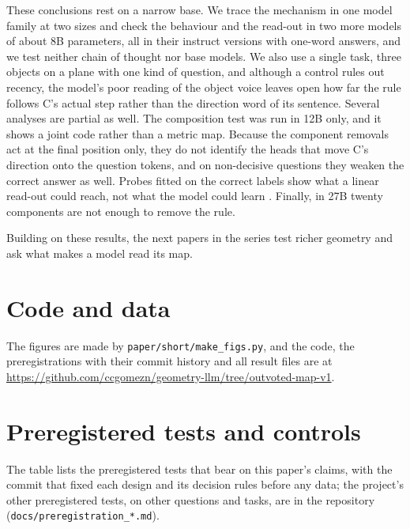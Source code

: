 \documentclass[11pt]{article}
\begin{document}
These conclusions rest on a narrow base. We trace the mechanism in one model family at two sizes and check the behaviour and the read-out in two
more models of about 8B parameters, all in their instruct versions with one-word answers, and we test neither chain
of thought nor base models. We also use a single task, three objects on a
plane with one kind of question, and although a control rules out recency, the model's poor reading of the object voice leaves open how far the rule follows C's actual step rather than the direction word of its sentence.
Several analyses are partial as well. The composition test was run in 12B only, and it shows a joint code rather than a
metric map. Because the component removals act at the final position only, they do not identify the heads that move
C's direction onto the question tokens, and on non-decisive questions they weaken the correct answer as well. Probes
fitted on the correct labels show what a linear read-out could reach, not what the model could learn
\citep{hewitt2019control}. Finally, in 27B twenty components are not enough to remove the rule.

Building on these results, the next papers in the series test richer geometry and ask what makes a model read its map.

\section*{Code and data}
The figures are made by \texttt{paper/short/make\_figs.py}, and the code, the preregistrations with their commit
history and all result files are at \url{https://github.com/ccgomezn/geometry-llm/tree/outvoted-map-v1}.




\appendix
\section{Preregistered tests and controls}\label{app:prereg}
The table lists the preregistered tests that bear on this paper's claims, with the commit that fixed each design and
its decision rules before any data; the project's other preregistered tests, on other questions and tasks, are in the
repository (\texttt{docs/preregistration\_*.md}).
\end{document}
